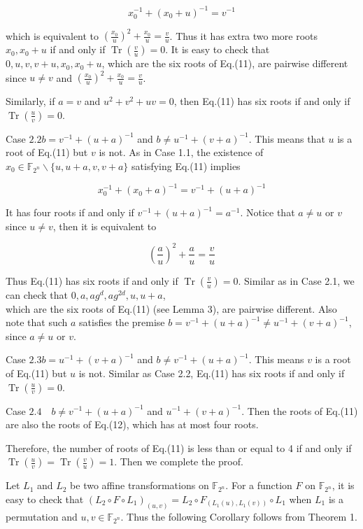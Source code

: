 \documentclass[10pt]{article}
\begin{document}
$$
x_{0}^{-1}+\left(x_{0}+u\right)^{-1}=v^{-1}
$$

which is equivalent to $\left(\frac{x_{0}}{u}\right)^{2}+\frac{x_{0}}{u}=\frac{v}{u}$. Thus it has extra two more roots $x_{0}, x_{0}+u$ if and only if $\operatorname{Tr}\left(\frac{v}{u}\right)=0$. It is easy to check that $0, u, v, v+u, x_{0}, x_{0}+u$, which are the six roots of Eq.(11), are pairwise different since $u \neq v$ and $\left(\frac{x_{0}}{u}\right)^{2}+\frac{x_{0}}{u}=\frac{v}{u}$.

Similarly, if $a=v$ and $u^{2}+v^{2}+u v=0$, then Eq.(11) has six roots if and only if $\operatorname{Tr}\left(\frac{u}{v}\right)=0$.

Case $2.2 b=v^{-1}+(u+a)^{-1}$ and $b \neq u^{-1}+(v+a)^{-1}$. This means that $u$ is a root of Eq.(11) but $v$ is not. As in Case 1.1, the existence of $x_{0} \in \mathbb{F}_{2^{n}} \backslash\{u, u+a, v, v+a\}$ satisfying Eq.(11) implies

$$
x_{0}^{-1}+\left(x_{0}+a\right)^{-1}=v^{-1}+(u+a)^{-1}
$$

It has four roots if and only if $v^{-1}+(u+a)^{-1}=a^{-1}$. Notice that $a \neq u$ or $v$ since $u \neq v$, then it is equivalent to

$$
\left(\frac{a}{u}\right)^{2}+\frac{a}{u}=\frac{v}{u}
$$

Thus Eq.(11) has six roots if and only if $\operatorname{Tr}\left(\frac{v}{u}\right)=0$. Similar as in Case 2.1, we can check that $0, a, a g^{d}, a g^{2 d}, u, u+a$,\\
which are the six roots of Eq.(11) (see Lemma 3), are pairwise different. Also note that such $a$ satisfies the premise $b=v^{-1}+(u+a)^{-1} \neq u^{-1}+(v+a)^{-1}$, since $a \neq u$ or $v$.

Case $2.3 b=u^{-1}+(v+a)^{-1}$ and $b \neq v^{-1}+(u+a)^{-1}$. This means $v$ is a root of Eq.(11) but $u$ is not. Similar as Case 2.2, Eq.(11) has six roots if and only if $\operatorname{Tr}\left(\frac{u}{v}\right)=0$.

Case $2.4 \quad b \neq v^{-1}+(u+a)^{-1}$ and $u^{-1}+(v+a)^{-1}$. Then the roots of Eq.(11) are also the roots of Eq.(12), which has at most four roots.

Therefore, the number of roots of Eq.(11) is less than or equal to 4 if and only if $\operatorname{Tr}\left(\frac{u}{v}\right)=\operatorname{Tr}\left(\frac{v}{u}\right)=1$. Then we complete the proof.

Let $L_{1}$ and $L_{2}$ be two affine transformations on $\mathbb{F}_{2^{n}}$. For a function $F$ on $\mathbb{F}_{2^{n}}$, it is easy to check that $\left(L_{2} \circ F \circ L_{1}\right)_{(u, v)}= L_{2} \circ F_{\left(L_{1}(u), L_{1}(v)\right)} \circ L_{1}$ when $L_{1}$ is a permutation and $u, v \in \mathbb{F}_{2^{n}}$. Thus the following Corollary follows from Theorem 1.
\end{document}
